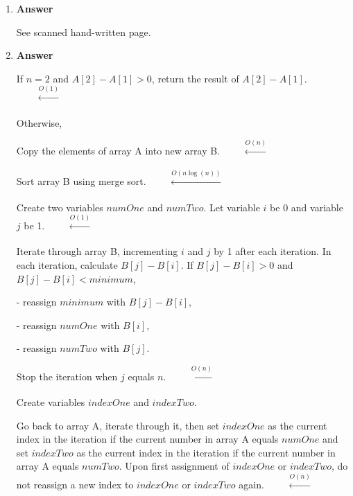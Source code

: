 \documentclass[12pt]{book}
\begin{document}
\newcommand{\reporttitle}{Assignment 1}
\newcommand{\reportauthorOne}{Kien Do}
\newcommand{\cidOne}{300163370}






\begin{enumerate}
    \item \textbf{Answer}
    
    See scanned hand-written page.
    
    \item \textbf{Answer}
    
    If $n = 2$ and $A[2] - A[1] > 0$, return the result of $A[2] - A[1]$. $\qquad \xleftarrow[]{O(1)}$
    
    Otherwise,
    
    Copy the elements of array A into new array B. $\qquad \xleftarrow[]{O(n)}$
    
    Sort array B using merge sort. $\qquad \xleftarrow[]{O(n\log(n))}$
    
    Create two variables $numOne$ and $numTwo$. Let variable $i$ be 0 and variable $j$ be 1. $\qquad \xleftarrow[]{O(1)}$
    
    Iterate through array B, incrementing $i$ and $j$ by 1 after each iteration. In each iteration, calculate $B[j] - B[i]$. If $B[j] - B[i] > 0$ and $B[j] - B[i] < minimum$,
    
    - reassign $minimum$ with $B[j] - B[i]$,
    
    - reassign $numOne$ with $B[i]$,
    
    - reassign $numTwo$ with $B[j]$.
    
    Stop the iteration when $j$ equals $n$. $\qquad \xleftarrow[]{O(n)}$
    
    Create variables $indexOne$ and $indexTwo$. 
    
    Go back to array A, iterate through it, then set $indexOne$ as the current index in the iteration if the current number in array A equals $numOne$ and set $indexTwo$ as the current index in the iteration if the current number in array A equals $numTwo$. Upon first assignment of $indexOne$ or $indexTwo$, do not reassign a new index to $indexOne$ or $indexTwo$ again. $\qquad \xleftarrow[]{O(n)}$
    

\end{enumerate}
\end{document}
